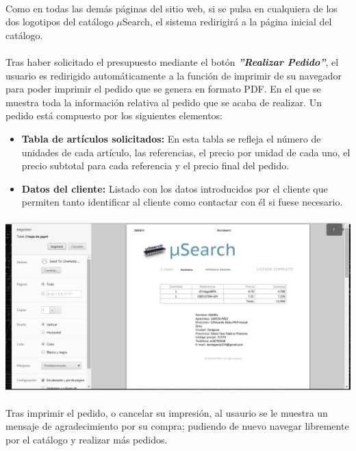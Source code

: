 \paragraph{}Como en todas las demás páginas del sitio web, si se pulsa en cualquiera de los dos logotipos del catálogo $\mu$Search, el sistema redirigirá a la página inicial del catálogo.

\paragraph{}Tras haber solicitado el presupuesto mediante el botón \textit{\textbf{''Realizar Pedido''}}, el usuario es redirigido automáticamente a la función de imprimir de su navegador para poder imprimir el pedido que se genera en formato PDF. En el que se muestra toda la información relativa al pedido que se acaba de realizar. Un pedido está compuesto por los siguientes elementos:

\begin{itemize}
	\item \textbf{Tabla de artículos solicitados:} En esta tabla se refleja el número de unidades de cada artículo, las referencias, el precio por unidad de cada uno, el precio subtotal para cada referencia y el precio final del pedido.
	
	\item \textbf{Datos del cliente:} Listado con los datos introducidos por el cliente que permiten tanto identificar al cliente como contactar con él si fuese necesario.
\end{itemize}

\begin{center}
	\paragraph{}\includegraphics[scale=0.35]{img/pedido}\singlelinebreak
\end{center}

\paragraph{} Tras imprimir el pedido, o cancelar su impresión, al usaurio se le muestra un mensaje de agradecimiento por su compra; pudiendo de nuevo navegar libremente por el catálogo y realizar más pedidos.